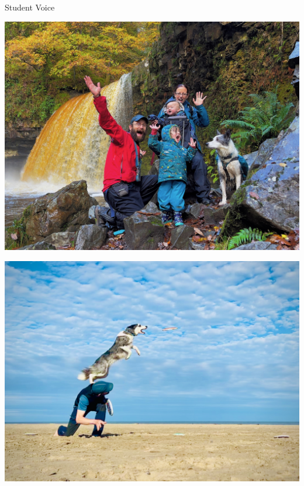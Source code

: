 \documentclass{beamer}
\begin{document}
    \begin{frame}
        \begin{center}
            \Huge Student Voice
        \end{center}
    \end{frame}

\begin{frame}
    \begin{center}
        \includegraphics[width=.9\textwidth]{assets/family.jpg}
    \end{center}
\end{frame}

\begin{frame}
    \begin{center}
        \includegraphics[width=.9\textwidth]{assets/flyingdog.jpg}
    \end{center}
\end{frame}
\end{document}
